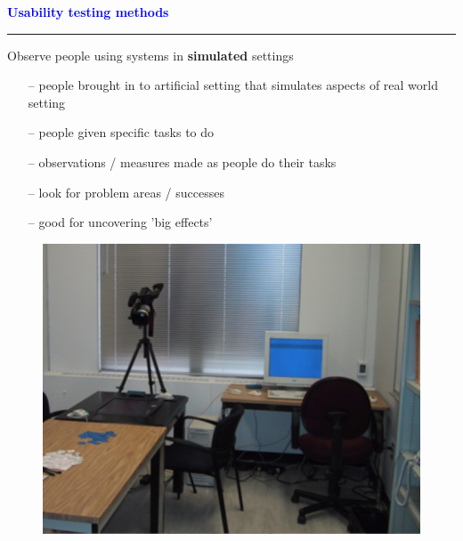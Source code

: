 \documentclass[pdf]{beamer}
\begin{document}
{%
{
\begin{frame}
    \textcolor{Blue}{\textbf{\Large{Usability testing methods}}}
    \textcolor{red}{\rule{10cm}{1mm}}
    Observe people using systems in \textbf{simulated} settings\par
    \begin{itemize}
    \item[\textcolor{black}{--}] people brought in to artificial setting that simulates aspects of real world setting
    \item[\textcolor{black}{--}] people given specific tasks to do
    \item[\textcolor{black}{--}] observations / measures made as people do their tasks
    \item[\textcolor{black}{--}] look for problem areas / successes
    \item[\textcolor{black}{--}] good for uncovering 'big effects'
    \end{itemize}
    \begin{figure}[b]
    	\includegraphics[scale = 0.4, right]{8_9_img.png}
    \end{figure}
\end{frame}}



}
\end{document}
